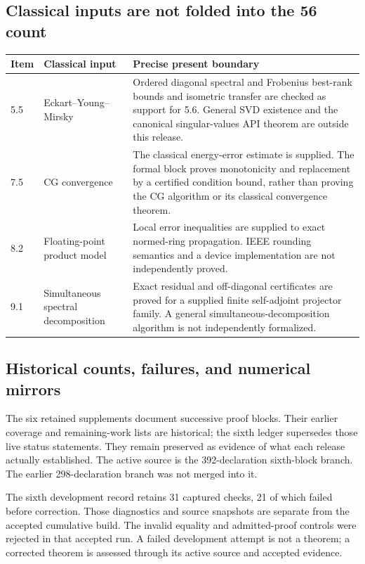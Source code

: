 \subsection{Classical inputs are not folded into the 56 count}
\begin{longtable}{@{}p{.16\linewidth}p{.27\linewidth}p{.50\linewidth}@{}}
\toprule Item & Classical input & Precise present boundary\\\midrule\endhead
5.5 & Eckart--Young--Mirsky & Ordered diagonal spectral and Frobenius best-rank bounds and isometric transfer are checked as support for 5.6. General SVD existence and the canonical singular-values API theorem are outside this release.\\
7.5 & CG convergence & The classical energy-error estimate is supplied. The formal block proves monotonicity and replacement by a certified condition bound, rather than proving the CG algorithm or its classical convergence theorem.\\
8.2 & Floating-point product model & Local error inequalities are supplied to exact normed-ring propagation. IEEE rounding semantics and a device implementation are not independently proved.\\
9.1 & Simultaneous spectral decomposition & Exact residual and off-diagonal certificates are proved for a supplied finite self-adjoint projector family. A general simultaneous-decomposition algorithm is not independently formalized.\\
\bottomrule\end{longtable}

\subsection{Historical counts, failures, and numerical mirrors}
The six retained supplements document successive proof blocks. Their earlier coverage and remaining-work lists are historical; the sixth ledger supersedes those live status statements. They remain preserved as evidence of what each release actually established. The active source is the 392-declaration sixth-block branch. The earlier 298-declaration branch was not merged into it.

The sixth development record retains 31 captured checks, 21 of which failed before correction. Those diagnostics and source snapshots are separate from the accepted cumulative build. The invalid equality and admitted-proof controls were rejected in that accepted run. A failed development attempt is not a theorem; a corrected theorem is assessed through its active source and accepted evidence.


